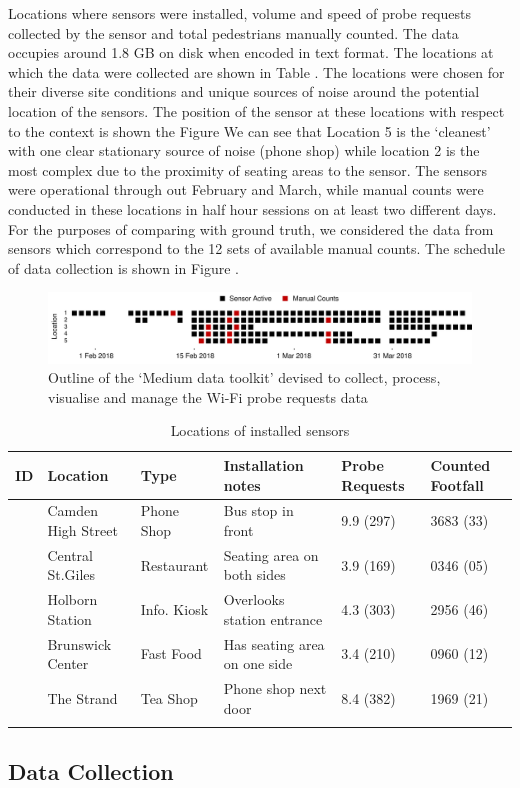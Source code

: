 Locations where sensors were installed, volume and speed of probe requests collected by the sensor and total pedestrians manually counted.
The data occupies around 1.8 GB on disk when encoded in text format.
The locations at which the data were collected are shown in Table .
The locations were chosen for their diverse site conditions and unique sources of noise around the potential location of the sensors.
The position of the sensor at these locations with respect to the context is shown the Figure 
We can see that Location 5 is the `cleanest' with one clear stationary source of noise (phone shop) while location 2 is the most complex due to the proximity of seating areas to the sensor.
The sensors were operational through out February and March, while manual counts were conducted in these locations in half hour sessions on at least two different days.
For the purposes of comparing with ground truth, we considered the data from sensors which correspond to the 12 sets of available manual counts.
The schedule of data collection is shown in Figure .

\begin{figure}
  \includegraphics{images/pilot-study-schedule.png}
  \caption{Outline of the `Medium data toolkit' devised to collect, process, visualise and manage the Wi-Fi probe requests data}
  \label{figure:literature:tech:timeline}
\end{figure}


\begin{table}
  \footnotesize
  \begin{center}
    \begin{tabular}{cm{2.5cm}lm{2.3cm}m{1.5cm}m{1.5cm}}
      \toprule
        ID & Location & Type & Installation notes & Probe Requests & Counted Footfall\\
      \midrule
        \addlinespace[0.4cm]
        1 & Camden High Street & Phone Shop & Bus stop in front & 9.9 (297) & 3683 (33)\\
        \addlinespace[0.2cm]
        2 & Central St.Giles & Restaurant & Seating area on both sides & 3.9 (169) & 0346 (05)\\
        \addlinespace[0.2cm]
        3 & Holborn Station & Info. Kiosk & Overlooks station entrance & 4.3 (303) & 2956 (46)\\
        \addlinespace[0.2cm]
        4 & Brunswick Center & Fast Food & Has seating area on one side & 3.4 (210) & 0960 (12)\\
        \addlinespace[0.2cm]
        5 & The Strand & Tea Shop & Phone shop next door & 8.4 (382) & 1969 (21)\\
        \addlinespace[0.1cm]
      \bottomrule
    \end{tabular}
  \end{center}
  \caption{Locations of installed sensors}
  \label{table:collection:pilot:location}
\end{table}

\subsection{Data Collection}



